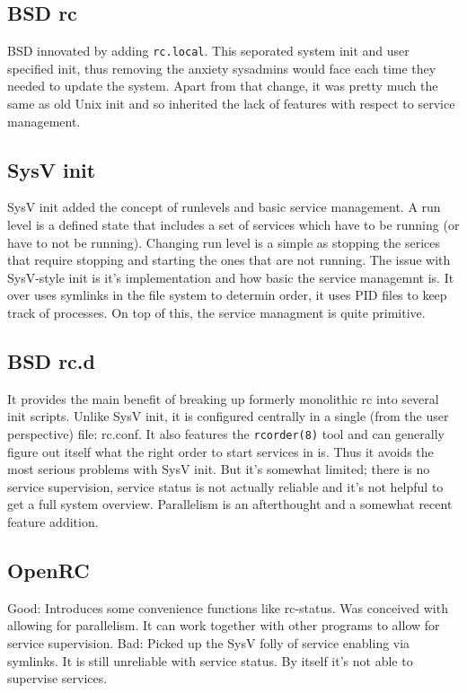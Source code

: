 \documentclass{article}
\begin{document}
\subsection{BSD rc}
BSD innovated by adding \texttt{rc.local}. This seporated system init and user specified
init, thus removing the anxiety sysadmins would face each time they needed to update the
system. Apart from that change, it was pretty much the same as old Unix init
and so inherited the lack of features with respect to service management.


\subsection{SysV init}
SysV init added the concept of runlevels and basic 
service management. A run level is a defined state that includes
a set of services which have to be running (or have to not be running). Changing run level
is a simple as stopping the serices that require stopping and starting the ones
that are not running. The issue with SysV-style init is it's implementation and
how basic the service managemnt is. It over uses symlinks in the file system to determin order,
it uses PID files to keep track of processes. On top of this, the service managment is
quite primitive.

\subsection{BSD rc.d}
It provides the main benefit of breaking up formerly monolithic rc into several
init scripts. Unlike SysV init, it is configured centrally in a single (from the user
perspective) file: rc.conf. It also features the \texttt{rcorder(8)} tool and can generally
figure out itself what the right order to start services in is. Thus it avoids the most
serious problems with SysV init. But it's somewhat limited;
there is no service supervision, service status is not actually reliable and it's not helpful
to get a full system overview. Parallelism is an afterthought and a somewhat recent feature
addition.

\subsection{OpenRC}
Good: Introduces some convenience functions like rc-status. Was conceived with allowing
for parallelism. It can work together with other programs to allow for service supervision.
Bad: Picked up the SysV folly of service enabling via symlinks. It is still unreliable with
service status. By itself it's not able to supervise services.
\end{document}
